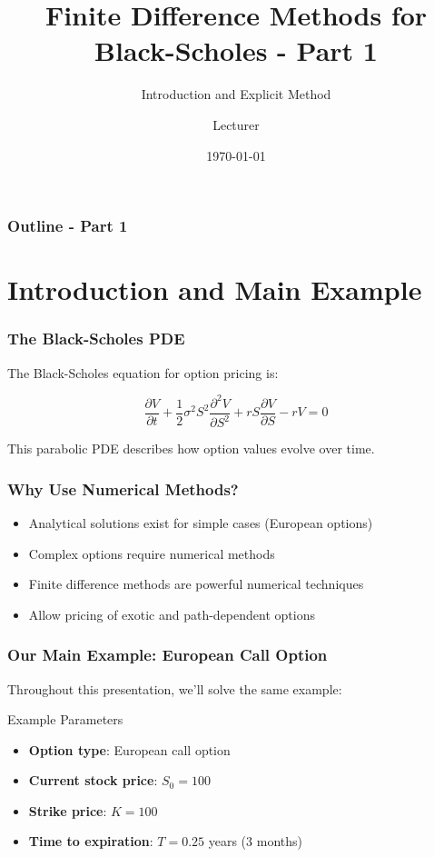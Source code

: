 \documentclass[aspectratio=169]{beamer}
\title{Finite Difference Methods for Black-Scholes - Part 1}
\subtitle{Introduction and Explicit Method}
\author{Lecturer}
\date{\today}
\begin{document}
\begin{frame}
\titlepage
\end{frame}

\begin{frame}
\frametitle{Outline - Part 1}
\tableofcontents
\end{frame}

\section{Introduction and Main Example}

\begin{frame}
\frametitle{The Black-Scholes PDE}
The Black-Scholes equation for option pricing is:

\[\frac{\partial V}{\partial t} + \frac{1}{2}\sigma^2 S^2 \frac{\partial^2 V}{\partial S^2} + rS \frac{\partial V}{\partial S} - rV = 0\]

This parabolic PDE describes how option values evolve over time.
\end{frame}

\begin{frame}
\frametitle{Why Use Numerical Methods?}
\begin{itemize}
\item Analytical solutions exist for simple cases (European options)
\item Complex options require numerical methods
\item Finite difference methods are powerful numerical techniques
\item Allow pricing of exotic and path-dependent options
\end{itemize}
\end{frame}

\begin{frame}
\frametitle{Our Main Example: European Call Option}
Throughout this presentation, we'll solve the same example:

\begin{block}{Example Parameters}
\begin{itemize}
\item \textbf{Option type}: European call option
\item \textbf{Current stock price}: $S_0 = 100$
\item \textbf{Strike price}: $K = 100$
\item \textbf{Time to expiration}: $T = 0.25$ years (3 months)
\end{itemize}
\end{block}
\end{frame}
\end{document}
